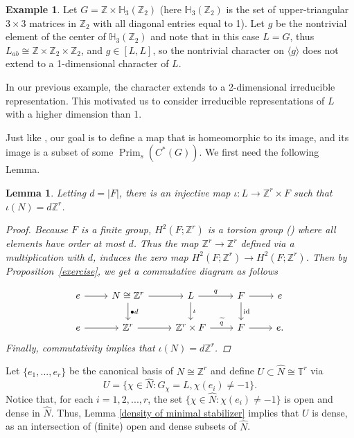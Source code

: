 \documentclass{amsart}
\newtheorem{lemma}[theorem]{Lemma}
\theoremstyle{definition}
\newtheorem{example}[theorem]{Example}
\newcommand{\Z}{\mathbb{Z}}
\newcommand{\TT}{\mathbb{T}}
\DeclareMathOperator{\id}{id}
\DeclareMathOperator{\Prim}{Prim}
\begin{document}
\begin{example}
     Let $G=\Z\times\mathbb{H}_3(\Z_2)$ (here $\mathbb{H}_3(\Z_2)$ is the set of upper-triangular $3\times 3$ matrices in $\Z_2$ with all diagonal entries equal to 1). Let $g$ be the nontrivial element of the center of $\mathbb{H}_3(\Z_2)$ and note that in this case $L=G$, thus $L_{ab}\cong \Z\times\Z_2\times\Z_2$, and $g\in[L,L]$, so the nontrivial character on $\langle g\rangle$ does not extend to a 1-dimensional character of $L$. \par
\end{example}
In our previous example, the character extends to a 2-dimensional irreducible representation. This motivated us to consider irreducible representations of $L$ with a higher dimension than 1. \par
Just like \cite{paper_untwisted_case}, our goal is to define a map that is homeomorphic to its image, and its image is a subset of some $\Prim_{s}(C^*(G))$. We first need the following Lemma.
\begin{lemma}\label{embedding lemma}
    Letting $d=|F|$, there is an injective map $\iota:L\to \Z^r\times F$ such that $\iota(N)=d\Z^{r}$.
    \begin{proof}
       Because $F$ is a finite group, $H^2(F;\Z^r)$ is a torsion group (\cite[Corollary III.10.2]{coho}) where all elements have order at most $d$. Thus the map $\Z^r\to \Z^r$ defined via a multiplication with $d$, induces the zero map $H^2(F;\Z^r)\to H^2(F;\Z^r)$. Then by Proposition~\ref{exercise}, we get a commutative diagram as follows

$$\begin{tikzcd}
e\arrow{r}&N\cong\Z^r\arrow{r}\arrow{d}{\bullet d}&L\arrow{r}{q}\arrow{d}{\iota}&F\arrow{r}\arrow{d}{\id}&e\\
e\arrow{r}&\Z^r\arrow{r}&\Z^r\times F\arrow{r}{\widetilde{q}}&F\arrow{r}&e.
\end{tikzcd}$$
Finally, commutativity implies that $\iota(N)=d\Z^r$.
    \end{proof}
\end{lemma}
Let $\{e_1,...,e_r\}$ be the canonical basis of $N\cong \Z^r$ and define $U\subset\widehat{N}\cong\TT^r$ via
$$U=\{\chi\in\widehat{N}:G_{\chi}=L,\chi(e_i)\ne -1\}.$$
Notice that, for each $i=1,2,...,r$, the set $\{\chi\in \widehat{N}:\chi(e_i)\neq -1\}$ is open and dense in $\widehat{N}$. Thus, Lemma \ref{density of minimal stabilizer} implies that $U$ is dense, as an intersection of (finite) open and dense subsets of $\widehat{N}$.
\end{document}
